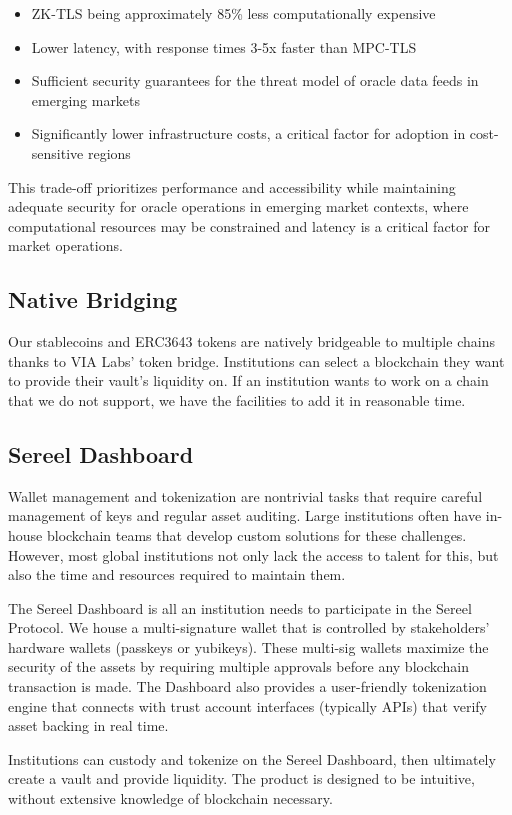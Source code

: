 \documentclass[12pt]{article}
\begin{document}
\begin{itemize}
  \item ZK-TLS being approximately 85\% less computationally expensive
  \item Lower latency, with response times 3-5x faster than MPC-TLS
  \item Sufficient security guarantees for the threat model of oracle data feeds in emerging markets
  \item Significantly lower infrastructure costs, a critical factor for adoption in cost-sensitive regions
\end{itemize}

This trade-off prioritizes performance and accessibility while maintaining adequate security for oracle operations in emerging market contexts, where computational resources may be constrained and latency is a critical factor for market operations.


\subsection{Native Bridging}
Our stablecoins and ERC3643 tokens are natively bridgeable to multiple chains thanks to VIA Labs' token bridge. Institutions can select a blockchain they want to provide their vault's liquidity on. If an institution wants to work on a chain that we do not support, we have the facilities to add it in reasonable time.
\subsection{Sereel Dashboard}
Wallet management and tokenization are nontrivial tasks that require careful management of keys and regular asset auditing. Large institutions often have in-house blockchain teams that develop custom solutions for these challenges. However, most global institutions not only lack the access to talent for this, but also the time and resources required to maintain them. 

The Sereel Dashboard is all an institution needs to participate in the Sereel Protocol. We house a multi-signature wallet that is controlled by stakeholders' hardware wallets (passkeys or yubikeys). These multi-sig wallets maximize the security of the assets by requiring multiple approvals before any blockchain transaction is made. The Dashboard also provides a user-friendly tokenization engine that connects with trust account interfaces (typically APIs) that verify asset backing in real time.

Institutions can custody and tokenize on the Sereel Dashboard, then ultimately create a vault and provide liquidity. The product is designed to be intuitive, without extensive knowledge of blockchain necessary.
\end{document}
